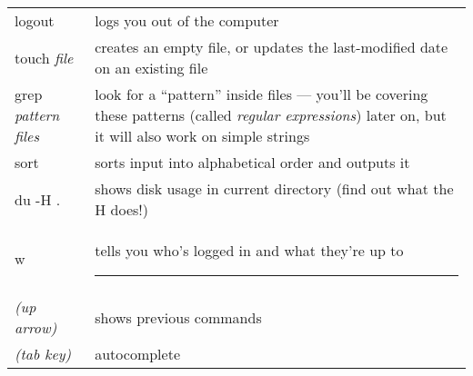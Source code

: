 \documentclass[twocolumn]{article}
\begin{document}
\begin{tabular}{l|p{2in}}
logout & logs you out of the computer\\
touch \emph{file} & creates an empty file, or updates the last-modified
date on an existing file\\
grep \emph{pattern} \emph{files} & look for a ``pattern'' inside files --- 
you'll be covering these patterns (called \emph{regular expressions}) later on,
but it will also work on simple strings\\
sort & sorts input into alphabetical order and outputs it \\
du -H . & shows disk usage in current directory (find out what the H does!)\\
w & tells you who's logged in and what they're up to \hrule\\
\emph{(up arrow)} & shows previous commands\\
\emph{(tab key)} & autocomplete\\

\end{tabular}
\end{document}
